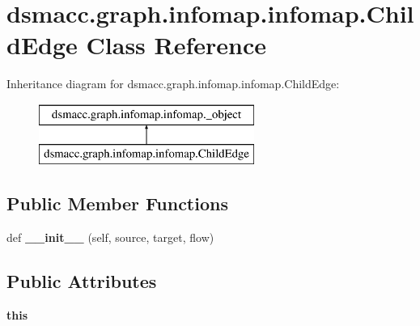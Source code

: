 \hypertarget{classdsmacc_1_1graph_1_1infomap_1_1infomap_1_1ChildEdge}{}\section{dsmacc.\+graph.\+infomap.\+infomap.\+Child\+Edge Class Reference}
\label{classdsmacc_1_1graph_1_1infomap_1_1infomap_1_1ChildEdge}
Inheritance diagram for dsmacc.\+graph.\+infomap.\+infomap.\+Child\+Edge\+:\begin{figure}[H]
\begin{center}
\leavevmode
\includegraphics[height=2.000000cm]{classdsmacc_1_1graph_1_1infomap_1_1infomap_1_1ChildEdge}
\end{center}
\end{figure}
\subsection*{Public Member Functions}
\begin{DoxyCompactItemize}
\item 
\mbox{\label{classdsmacc_1_1graph_1_1infomap_1_1infomap_1_1ChildEdge_af1dd75275f0e62be6a531e429ecaedf7}} 
def {\bfseries \+\_\+\+\_\+init\+\_\+\+\_\+} (self, source, target, flow)
\end{DoxyCompactItemize}
\subsection*{Public Attributes}
\begin{DoxyCompactItemize}
\item 
\mbox{\label{classdsmacc_1_1graph_1_1infomap_1_1infomap_1_1ChildEdge_a5c45d28146acc059f89a8c8095119e0f}} 
{\bfseries this}
\end{DoxyCompactItemize}

